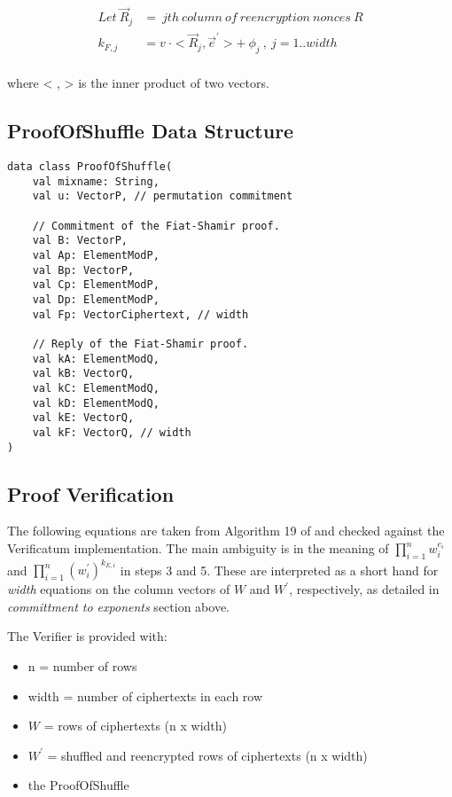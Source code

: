 \documentclass{article}
\begin{document}
\begin{align*}
Let\ \vec{R}_{j} & =\ jth\ column\ of\ reencryption\ nonces\ R\\
k_{F,j} & =v\ \cdot<\vec{R}_{j},\vec{e}^{\prime}>+\ \phi_{j}\ ,\ j=1..width\\
\end{align*}

where < , > is the inner product of two vectors.

\subsection*{ProofOfShuffle Data Structure}
\begin{verbatim}
data class ProofOfShuffle(
    val mixname: String,
    val u: VectorP, // permutation commitment

    // Commitment of the Fiat-Shamir proof.
    val B: VectorP, 
    val Ap: ElementModP, 
    val Bp: VectorP, 
    val Cp: ElementModP, 
    val Dp: ElementModP, 
    val Fp: VectorCiphertext, // width

    // Reply of the Fiat-Shamir proof.
    val kA: ElementModQ,
    val kB: VectorQ,
    val kC: ElementModQ,
    val kD: ElementModQ,
    val kE: VectorQ,
    val kF: VectorQ, // width
)
\end{verbatim}

\subsection*{Proof Verification}

The following equations are taken from Algorithm 19 of \cite{Wikstr22} and
checked against the Verificatum implementation. The main ambiguity
is in the meaning of $\prod_{i=1}^{n}w_{i}^{e_{i}}$ and $\prod_{i=1}^{n}(w_{i}^{\prime})^{k_{E,i}}$
in steps 3 and 5. These are interpreted as a short hand for \emph{width}
equations on the column vectors of $W$ and $W^{\prime}$, respectively,
as detailed in \emph{committment to exponents} section above.

The Verifier is provided with:

\begin{itemize}
\item n = number of rows 
\item width = number of ciphertexts in each row 
\item $W$ = rows of ciphertexts (n x width) 
\item $W^{\prime}$ = shuffled and reencrypted rows of ciphertexts (n x width) 
\item the ProofOfShuffle 
\end{itemize}
\end{document}
